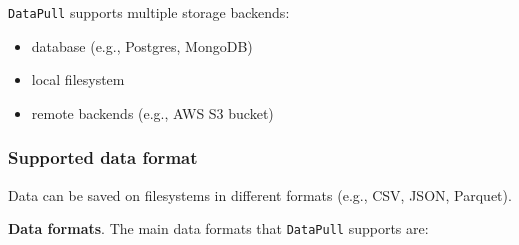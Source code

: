 \documentclass[11pt, reqno]{amsart}
\theoremstyle{definition}
\theoremstyle{remark}
\begin{document}
\verb|DataPull| supports multiple storage backends:

\begin{itemize}
  \item database (e.g., Postgres, MongoDB)
  \item local filesystem
  \item remote backends (e.g., AWS S3 bucket)
\end{itemize}

\subsubsection{Supported data format}

Data can be saved on filesystems in different formats (e.g., CSV, JSON,
Parquet).

\textbf{Data formats}. The main data formats that \verb|DataPull|
supports are:
\end{document}
